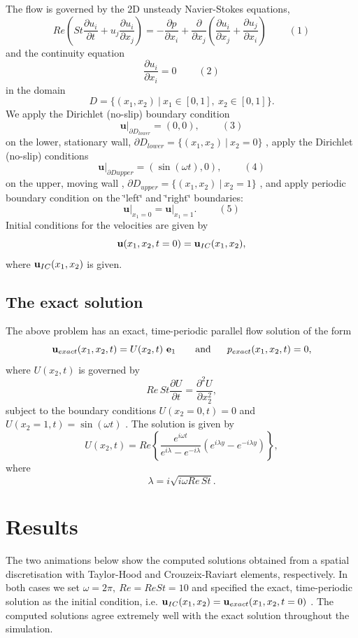 \begin{center}
\begin{longtabu}
The flow is governed by the 2D unsteady Navier-\/\+Stokes equations, \[ Re\left(St\frac{\partial u_i}{\partial t} + u_j\frac{\partial u_i}{\partial x_j}\right) = - \frac{\partial p}{\partial x_i} + \frac{\partial }{\partial x_j} \left( \frac{\partial u_i}{\partial x_j} + \frac{\partial u_j}{\partial x_i} \right) \ \ \ \ \ \ \ \ \ \ (1) \] and the continuity equation \[ \frac{\partial u_i}{\partial x_i} = 0 \ \ \ \ \ \ \ \ \ \ (2) \] in the domain \[ D = \bigg\{(x_1,x_2) \ | \ x_1 \in [0,1], \ x_2 \in [0,1] \bigg\}. \] We apply the Dirichlet (no-\/slip) boundary condition \[ \left. \mathbf{u}\right|_{\partial D_{lower}}=(0,0), \ \ \ \ \ \ \ \ \ \ (3) \] on the lower, stationary wall, $ \partial D_{lower} = \big\{(x_1,x_2) \ | \ x_2=0 \big\} $ , apply the Dirichlet (no-\/slip) conditions \[ \left. \mathbf{u}\right|_{\partial D{upper}}=(\sin\left(\omega t\right),0), \ \ \ \ \ \ \ \ \ \ (4) \] on the upper, moving wall , $ \partial D_{upper} = \big\{(x_1,x_2) \ | \ x_2=1 \big\} $ , and apply periodic boundary condition on the \char`\"{}left\char`\"{} and \char`\"{}right\char`\"{} boundaries\+: \[ \left.\mathbf{u}\right|_{x_1=0} = \left.\mathbf{u}\right|_{x_1=1}. \ \ \ \ \ \ \ \ \ \ (5) \] Initial conditions for the velocities are given by \[ {\bf u}(x_1,x_2,t=0) = {\bf u}_{IC}(x_1,x_2), \] where $ {\bf u}_{IC}(x_1,x_2)$ is given.   \\
\end{longtabu}
\end{center} 



\hypertarget{index_solution}{}\subsection{The exact solution}\label{index_solution}
The above problem has an exact, time-\/periodic parallel flow solution of the form \[ {\bf u}_{exact}(x_1,x_2,t) = U(x_2,t) \ {\bf e}_1 \mbox{ \ \ \ \ \ and \ \ \ \ } p_{exact}(x_1,x_2,t) = 0, \] where $ U(x_2,t) $ is governed by \[ Re\, St\frac{\partial U}{\partial t} = \frac{\partial^2 U}{\partial x_2^2}, \] subject to the boundary conditions $ U(x_2=0,t)=0$ and $ U(x_2=1,t)=\sin(\omega t)$ . The solution is given by \[ U(x_2,t) = Re\left\{\frac{e^{i\omega t}}{e^{i\lambda}-e^{-i\lambda}} \left(e^{i\lambda y}-e^{-i\lambda y}\right)\right\}, \] where \[ \lambda = i\sqrt{i\omega Re\, St}. \]



\hypertarget{index_results}{}\section{Results}\label{index_results}
The two animations below show the computed solutions obtained from a spatial discretisation with Taylor-\/\+Hood and Crouzeix-\/\+Raviart elements, respectively. In both cases we set $ \omega=2\pi, \ Re = ReSt = 10 $ and specified the exact, time-\/periodic solution as the initial condition, i.\+e. $ {\bf u}_{IC}(x_1,x_2) = {\bf u}_{exact}(x_1,x_2,t=0)$ . The computed solutions agree extremely well with the exact solution throughout the simulation.

